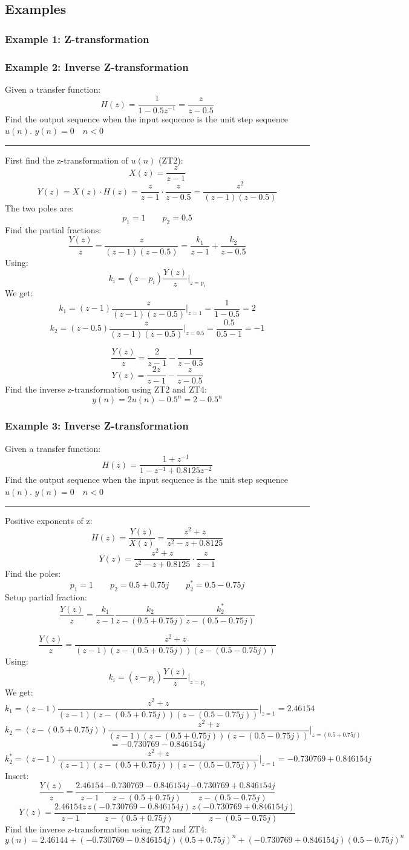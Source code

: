\subsection{Examples}
\subsubsection{Example 1: Z-transformation}
\subsubsection{Example 2: Inverse Z-transformation}
Given a transfer function:
$$H(z)=\frac{1}{1-0.5z^{-1}}=\frac{z}{z-0.5}$$
Find the output sequence when the input sequence is the unit step sequence $u(n)$. $y(n)=0\quad n<0$

\rule{\textwidth}{0.5pt}

First find the z-transformation of $u(n)$ (ZT2):
$$X(z)=\frac{z}{z-1}$$
$$Y(z)=X(z)\cdot H(z)=\frac{z}{z-1}\cdot \frac{z}{z-0.5}=\frac{z^2}{(z-1)(z-0.5)}$$
The two poles are:
$$p_1=1\qquad p_2=0.5$$
Find the partial fractions:
$$\frac{Y(z)}{z}=\frac{z}{(z-1)(z-0.5)}=\frac{k_1}{z-1}+\frac{k_2}{z-0.5}$$
Using:
$$k_{i}=(z-p_{i})\frac{Y(z)}{z}\vert_{z=p_{i}}$$
We get:
$$k_{1}=(z-1)\frac{z}{(z-1)(z-0.5)}\vert_{z=1}=\frac{1}{1-0.5}=2$$
$$k_{2}=(z-0.5)\frac{z}{(z-1)(z-0.5)}\vert_{z=0.5}=\frac{0.5}{0.5-1}=-1$$

$$\frac{Y(z)}{z}=\frac{2}{z-1}-\frac{1}{z-0.5}$$
$$Y(z)=\frac{2z}{z-1}-\frac{z}{z-0.5}$$
Find the inverse z-transformation using ZT2 and ZT4:
$$y(n)=2u(n)-0.5^{n}=2-0.5^{n}$$

\subsubsection{Example 3: Inverse Z-transformation}
Given a transfer function:
$$H(z)=\frac{1+z^{-1}}{1-z^{-1}+0.8125z^{-2}}$$
Find the output sequence when the input sequence is the unit step sequence $u(n)$. $y(n)=0\quad n<0$

\rule{\textwidth}{0.5pt}

Positive exponents of z:
$$H(z)=\frac{Y(z)}{X(z)}=\frac{z^2+z}{z^2-z+0.8125}$$
$$Y(z)=\frac{z^2+z}{z^2-z+0.8125}\cdot \frac{z}{z-1}$$
Find the poles:
$$p_1=1\qquad p_2=0.5 +0.75j\qquad p_2^*=0.5 -0.75j$$
Setup partial fraction:
$$\frac{Y(z)}{z}=\frac{k_1}{z-1}\frac{k_2}{z-(0.5+0.75j)}\frac{k_2^*}{z-(0.5-0.75j)}$$

$$\frac{Y(z)}{z}=\frac{z^2+z}{(z-1)(z-(0.5+0.75j))(z-(0.5-0.75j))}$$
Using:
$$k_{i}=(z-p_{i})\frac{Y(z)}{z}\vert_{z=p_{i}}$$
We get:
$$k_{1}=(z-1)\frac{z^2+z}{(z-1)(z-(0.5+0.75j))(z-(0.5-0.75j))}\vert_{z=1}=2.46154$$
$$k_{2}=(z-(0.5+0.75j))\frac{z^2+z}{(z-1)(z-(0.5+0.75j))(z-(0.5-0.75j))}\vert_{z=(0.5+0.75j)}$$
$$=-0.730769-0.846154j$$
$$k_{2}^*=(z-1)\frac{z^2+z}{(z-1)(z-(0.5+0.75j))(z-(0.5-0.75j))}\vert_{z=1}=-0.730769+0.846154j$$
Insert:
$$\frac{Y(z)}{z}=\frac{2.46154}{z-1}\frac{-0.730769-0.846154j}{z-(0.5+0.75j)}\frac{-0.730769+0.846154j}{z-(0.5-0.75j)}$$
$$Y(z)=\frac{2.46154z}{z-1}\frac{z(-0.730769-0.846154j)}{z-(0.5+0.75j)}\frac{z(-0.730769+0.846154j)}{z-(0.5-0.75j)}$$
Find the inverse z-transformation using ZT2 and ZT4:
$$y(n)=2.46144 +(-0.730769-0.846154j)(0.5+0.75j)^n+(-0.730769+0.846154j)(0.5-0.75j)^n$$
